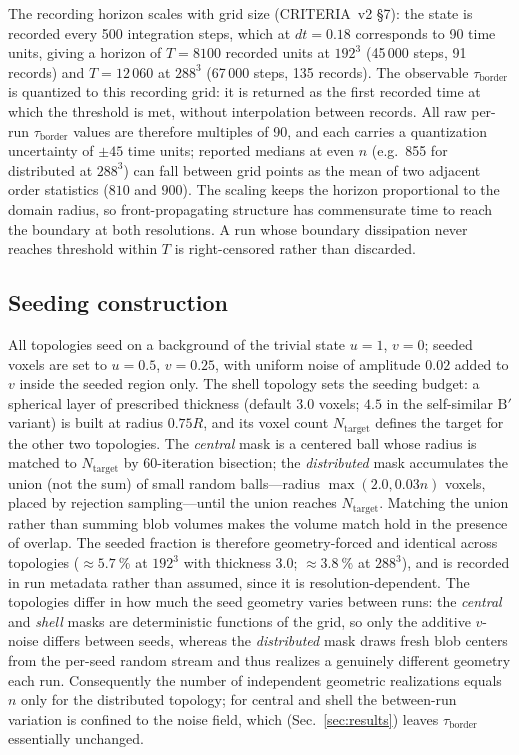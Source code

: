 \documentclass[aps,pre,preprint,superscriptaddress,nofootinbib,floatfix]{revtex4-2}
\newcommand{\tb}{\tau_{\mathrm{border}}}
\begin{document}
The recording horizon scales with grid size (CRITERIA~v2 \S7): the state is recorded every 500 integration steps, which at $dt=0.18$ corresponds to 90 time units, giving a horizon of $T=8100$ recorded units at $192^3$ (45\,000 steps, 91 records) and $T=12\,060$ at $288^3$ (67\,000 steps, 135 records). The observable $\tb$ is quantized to this recording grid: it is returned as the first recorded time at which the threshold is met, without interpolation between records. All raw per-run $\tb$ values are therefore multiples of 90, and each carries a quantization uncertainty of $\pm45$ time units; reported medians at even $n$ (e.g.\ 855 for distributed at $288^3$) can fall between grid points as the mean of two adjacent order statistics ($810$ and $900$). The scaling keeps the horizon proportional to the domain radius, so front-propagating structure has commensurate time to reach the boundary at both resolutions. A run whose boundary dissipation never reaches threshold within $T$ is right-censored rather than discarded.

\subsection{Seeding construction}

All topologies seed on a background of the trivial state $u=1$, $v=0$; seeded voxels are set to $u=0.5$, $v=0.25$, with uniform noise of amplitude $0.02$ added to $v$ inside the seeded region only. The shell topology sets the seeding budget: a spherical layer of prescribed thickness (default $3.0$ voxels; $4.5$ in the self-similar $\mathrm{B}'$ variant) is built at radius $0.75R$, and its voxel count $N_{\mathrm{target}}$ defines the target for the other two topologies. The \textit{central} mask is a centered ball whose radius is matched to $N_{\mathrm{target}}$ by 60-iteration bisection; the \textit{distributed} mask accumulates the union (not the sum) of small random balls---radius $\max(2.0, 0.03n)$ voxels, placed by rejection sampling---until the union reaches $N_{\mathrm{target}}$. Matching the union rather than summing blob volumes makes the volume match hold in the presence of overlap. The seeded fraction is therefore geometry-forced and identical across topologies (${\approx}\SI{5.7}{\percent}$ at $192^3$ with thickness $3.0$; ${\approx}\SI{3.8}{\percent}$ at $288^3$), and is recorded in run metadata rather than assumed, since it is resolution-dependent. The topologies differ in how much the seed geometry varies between runs: the \textit{central} and \textit{shell} masks are deterministic functions of the grid, so only the additive $v$-noise differs between seeds, whereas the \textit{distributed} mask draws fresh blob centers from the per-seed random stream and thus realizes a genuinely different geometry each run. Consequently the number of independent geometric realizations equals $n$ only for the distributed topology; for central and shell the between-run variation is confined to the noise field, which (Sec.~\ref{sec:results}) leaves $\tb$ essentially unchanged.
\end{document}
